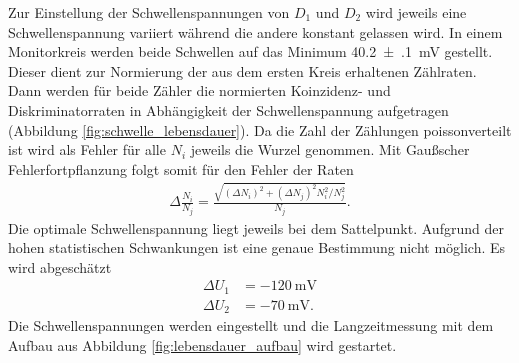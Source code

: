 Zur Einstellung der Schwellenspannungen von $D_1$ und $D_2$ wird jeweils eine Schwellenspannung variiert während die andere konstant gelassen wird. In einem Monitorkreis werden beide Schwellen auf das Minimum \SI[separate-uncertainty = true]{40.2(1)}{\milli\volt} gestellt. Dieser dient zur Normierung der aus dem ersten Kreis erhaltenen Zählraten. Dann werden für beide Zähler die normierten Koinzidenz- und Diskriminatorraten in Abhängigkeit der Schwellenspannung aufgetragen (Abbildung \ref{fig:schwelle_lebensdauer}). Da die Zahl der Zählungen poissonverteilt ist wird als Fehler für alle $N_i$ jeweils die Wurzel genommen. Mit Gaußscher Fehlerfortpflanzung folgt somit für den Fehler der Raten 
\begin{align*}
  \Delta \frac{N_i}{N_j}=\frac{\sqrt{(\Delta N_i)^2+(\Delta N_j)^2N_i^2/N_j^2}}{N_j}.
\end{align*} 
Die optimale Schwellenspannung liegt jeweils bei dem Sattelpunkt. Aufgrund der hohen statistischen Schwankungen ist eine genaue Bestimmung nicht möglich. Es wird abgeschätzt
\begin{align*}
  \Delta U_1&=-\SI{120}{\milli\volt}\\
  \Delta U_2&=-\SI{70}{\milli\volt}.
\end{align*} 
Die Schwellenspannungen werden eingestellt und die Langzeitmessung mit dem Aufbau aus Abbildung \ref{fig:lebensdauer_aufbau} wird gestartet.

\newpage

